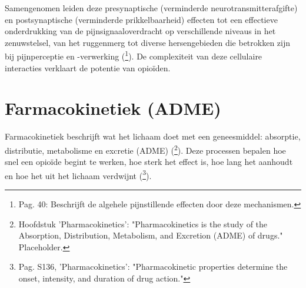 \documentclass[11pt, a4paper]{report} %
\begin{document}
Samengenomen leiden deze presynaptische (verminderde neurotransmitterafgifte) en postsynaptische (verminderde prikkelbaarheid) effecten tot een effectieve onderdrukking van de pijnsignaaloverdracht op verschillende niveaus in het zenuwstelsel, van het ruggenmerg tot diverse hersengebieden die betrokken zijn bij pijnperceptie en -verwerking (\cite{SciELO2020Opioids}\footnote{Pag. 40: Beschrijft de algehele pijnstillende effecten door deze mechanismen.}). De complexiteit van deze cellulaire interacties verklaart de potentie van opioïden.

\section{Farmacokinetiek (ADME)}
Farmacokinetiek beschrijft wat het lichaam doet met een geneesmiddel: absorptie, distributie, metabolisme en excretie (ADME) (\cite{SomePharmacologyTextbook}\footnote{Hoofdstuk 'Pharmacokinetics': "Pharmacokinetics is the study of the Absorption, Distribution, Metabolism, and Excretion (ADME) of drugs." Placeholder.}). Deze processen bepalen hoe snel een opioïde begint te werken, hoe sterk het effect is, hoe lang het aanhoudt en hoe het uit het lichaam verdwijnt (\cite{Trescot2008OpioidPharm}\footnote{Pag. S136, 'Pharmacokinetics': "Pharmacokinetic properties determine the onset, intensity, and duration of drug action."}).
\end{document}
